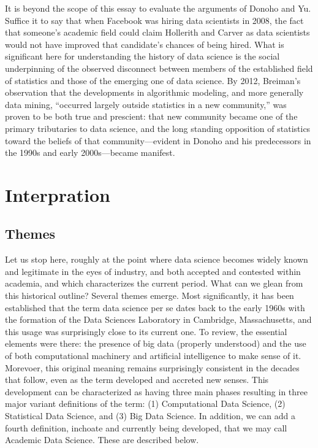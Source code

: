 \documentclass[
  letterpaper,
]{report}
\begin{document}
It is beyond the scope of this essay to evaluate the arguments of Donoho
and Yu. Suffice it to say that when Facebook was hiring data scientists
in 2008, the fact that someone's academic field could claim Hollerith
and Carver as data scientists would not have improved that candidate's
chances of being hired. What is significant here for understanding the
history of data science is the social underpinning of the observed
disconnect between members of the established field of statistics and
those of the emerging one of data science. By 2012, Breiman's
observation that the developments in algorithmic modeling, and more
generally data mining, ``occurred largely outside statistics in a new
community,'' was proven to be both true and prescient: that new
community became one of the primary tributaries to data science, and the
long standing opposition of statistics toward the beliefs of that
community---evident in Donoho and his predecessors in the 1990s and
early 2000s---became manifest.

\hypertarget{interpration}{%
\chapter{Interpration}\label{interpration}}

\hypertarget{themes}{%
\section{Themes}\label{themes}}

Let us stop here, roughly at the point where data science becomes widely
known and legitimate in the eyes of industry, and both accepted and
contested within academia, and which characterizes the current period.
What can we glean from this historical outline? Several themes emerge.
Most significantly, it has been established that the term data science
per se dates back to the early 1960s with the formation of the Data
Sciences Laboratory in Cambridge, Massachusetts, and this usage was
surprisingly close to its current one. To review, the essential elements
were there: the presence of big data (properly understood) and the use
of both computational machinery and artificial intelligence to make
sense of it. Morevoer, this original meaning remains surprisingly
consistent in the decades that follow, even as the term developed and
accreted new senses. This development can be characterized as having
three main phases resulting in three major variant definitions of the
term: (1) Computational Data Science, (2) Statistical Data Science, and
(3) Big Data Science. In addition, we can add a fourth definition,
inchoate and currently being developed, that we may call Academic Data
Science. These are described below.
\end{document}

